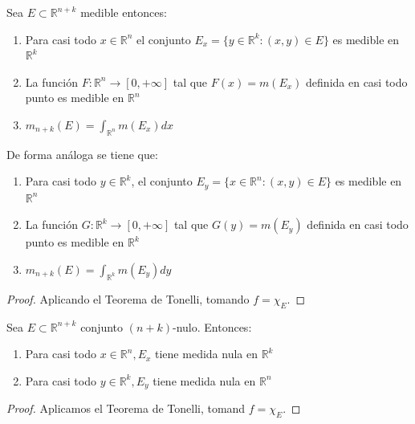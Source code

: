\begin{corolario}
    Sea $E \subset \mathbb{R}^{n+k}$ medible entonces:
    \vspace{-0.5em}
    \begin{enumerate}
        \item Para casi todo $x \in \mathbb{R}^n$ el conjunto $E_x = \{ y \in \mathbb{R}^k :
                  (x, y) \in E \}$ es medible en $\mathbb{R}^k$
        \item La función $F: \mathbb{R}^n \to [0, +\infty]$ tal que $F(x) = m(E_x)$ definida
              en casi todo punto es medible en $\mathbb{R}^n$
        \item $m_{n+k}(E) = \int_{\mathbb{R}^n}m(E_x)dx$
    \end{enumerate}
    De forma análoga se tiene que:
    \vspace{-0.5em}
    \begin{enumerate}
        \item Para casi todo $y \in \mathbb{R}^k$, el conjunto $E_y = \{ x \in \mathbb{R}^n :
                  (x, y) \in E \}$ es medible en $\mathbb{R}^n$
        \item La función $G: \mathbb{R}^k \to [0, +\infty]$ tal que $G(y) = m(E_y)$ definida
              en casi todo punto es medible en $\mathbb{R}^k$
        \item $m_{n+k}(E) = \int_{\mathbb{R}^k}m(E_y)dy$
    \end{enumerate}
\end{corolario}
\begin{proof}
    Aplicando el Teorema de Tonelli, tomando $f = \chi_E$.
\end{proof}
\begin{corolario}
    Sea $E \subset \mathbb{R}^{n+k}$ conjunto $(n+k)$-nulo. Entonces:
    \vspace{-0.5em}
    \begin{enumerate}
        \item Para casi todo $x \in \mathbb{R}^n, E_x$ tiene medida nula en $\mathbb{R}^k$
        \item Para casi todo $y \in \mathbb{R}^k, E_y$ tiene medida nula en $\mathbb{R}^n$
    \end{enumerate}
\end{corolario}
\begin{proof}
    Aplicamos el Teorema de Tonelli, tomand $f = \chi_E$.
\end{proof}
